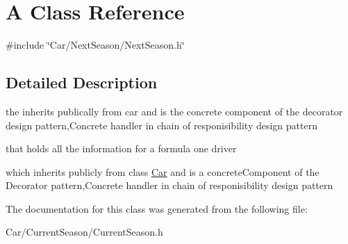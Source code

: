 \hypertarget{classA}{}\section{A Class Reference}
\label{classA}


{\ttfamily \#include \char`\"{}Car/\+Next\+Season/\+Next\+Season.\+h\char`\"{}}



\subsection{Detailed Description}
the inherits publically from car and is the concrete component of the decorator design pattern,Concrete handler in chain of responisibility design pattern

that holds all the information for a formula one driver

which inherits publicly from class \hyperlink{classCar}{Car} and is a concrete\+Component of the Decorator pattern,Concrete handler in chain of responisibility design pattern 

The documentation for this class was generated from the following file\+:\begin{DoxyCompactItemize}
\item 
Car/\+Current\+Season/Current\+Season.\+h\end{DoxyCompactItemize}
